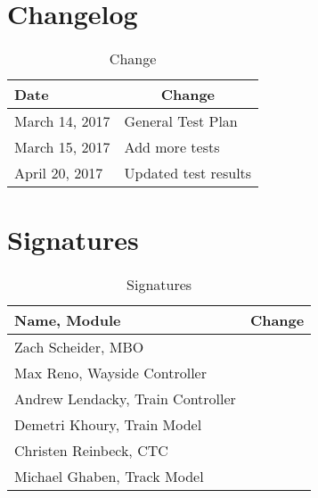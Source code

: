 \documentclass[]{article}
\begin{document}
\section{Changelog}

\begin{table}[H]
	\centering
	\caption{Change}
	\label{changelogl}
	\begin{tabular}{|l|l|}
		\hline
		Date & \multicolumn{1}{c|}{Change} \\ \hline
		March 14, 2017 & General Test Plan \\ \hline
		March 15, 2017 & Add more tests \\ \hline
		April 20, 2017 & Updated test results \\ \hline
	\end{tabular}
\end{table}

\section{Signatures}

\begin{table}[H]
	\centering
	\caption{Signatures}
	\label{signatures}
	\begin{tabular}{|l|l|}
		\hline
		Name, Module & \multicolumn{1}{c|}{Change} \\ \hline
		Zach Scheider, MBO & \\ \hline
		Max Reno, Wayside Controller & \\ \hline
		Andrew Lendacky, Train Controller & \\ \hline
		Demetri Khoury, Train Model & \\ \hline
		Christen Reinbeck, CTC & \\ \hline
		Michael Ghaben, Track Model \\ \hline
	\end{tabular}
\end{table}
\end{document}
